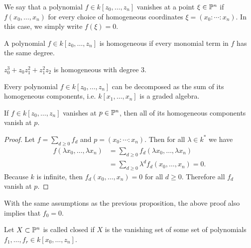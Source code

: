 \documentclass[twoside, 10pt]{article}
\begin{document}
    \begin{defn} We say that a polynomial $f \in k[z_0, \ldots, z_n]$ vanishes
        at a point $\xi \in \P^n$ if $f(x_0, \ldots, x_n)$ for every choice of
        homogeneous coordinates $\xi = (x_0:\cdots:x_n)$. In this case, we
        simply write $f(\xi) = 0$.  \end{defn}

    \begin{defn} A polynomial $f \in k[z_0, \ldots,
    z_n]$ is homogeneous if every monomial term in $f$ has the same degree.
\end{defn}

    \begin{exm} $z_0^3 + z_0z_1^2 + z_1^2z_2$ is homogeneous with degree $3$.
    \end{exm}

    \begin{rmk} Every polynomial $f \in k[z_0, \ldots, z_n]$ can be decomposed
    as the sum of its homogeneous components, i.e. $k[x_1, \ldots, x_n]$ is a
graded algebra.  \end{rmk}

    \begin{prop} If $f \in k[z_0, \ldots, z_n]$ vanishes at $p \in \P^n$, then
        all of its homogeneous components vanish at $p$.  \begin{proof} Let $f
            = \sum_{d \geq 0} f_d$ and $p = (x_0:\cdots:x_n)$. Then for all
            $\lambda \in k^*$ we have \begin{align*} f(\lambda x_0, \ldots,
            \lambda x_n) &= \sum_{d \geq 0} f_d(\lambda x_0, \ldots, \lambda
        x_n) \\ &= \sum_{d \geq 0} \lambda^d f_d(x_0, \ldots, x_n) = 0.
    \end{align*} Because $k$ is infinite, then $f_d(x_0, \ldots, x_n) = 0$ for
    all $d \geq 0$. Therefore all $f_d$ vanish at $p$.  \end{proof} \end{prop}

    \begin{rmk} With the same assumptions as the previous proposition, the
    above proof also implies that $f_0 = 0$.  \end{rmk}

    \begin{defn} Let $X \subset \P^n$ is called closed if $X$ is
    the vanishing set of some set of polynomials $f_1, \ldots, f_r \in k[x_0,
\ldots, z_n]$.  \end{defn}
\end{document}
